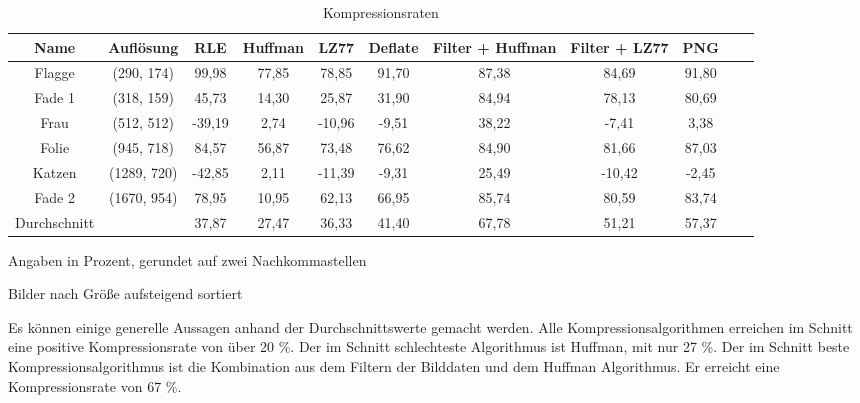 \documentclass[conference]{IEEEtran}
\begin{document}
\begin{table}
  \renewcommand*{\arraystretch}{1.1}
  \centering
  \begin{threeparttable}
    \caption{Kompressionsraten}
    \begin{tabular}{c *9{c} S[table-format=5.9]}
      \toprule
      Name         & Auflösung   & RLE    & Huffman & LZ77   & Deflate & Filter + Huffman & Filter + LZ77 & PNG   \\
      \midrule
      Flagge       & (290, 174)  & 99,98  & 77,85   & 78,85  & 91,70   & 87,38            & 84,69         & 91,80 \\
      Fade 1       & (318, 159)  & 45,73  & 14,30   & 25,87  & 31,90   & 84,94            & 78,13         & 80,69 \\
      Frau         & (512, 512)  & -39,19 & 2,74    & -10,96 & -9,51   & 38,22            & -7,41         & 3,38  \\
      Folie        & (945, 718)  & 84,57  & 56,87   & 73,48  & 76,62   & 84,90            & 81,66         & 87,03 \\
      Katzen       & (1289, 720) & -42,85 & 2,11    & -11,39 & -9,31   & 25,49            & -10,42        & -2,45 \\
      Fade 2       & (1670, 954) & 78,95  & 10,95   & 62,13  & 66,95   & 85,74            & 80,59         & 83,74 \\
      \bottomrule
      Durchschnitt &             & 37,87  & 27,47   & 36,33  & 41,40   & 67,78            & 51,21         & 57,37 \\
    \end{tabular}
    \par{} Angaben in Prozent, gerundet auf zwei Nachkommastellen
    \par{} Bilder nach Größe aufsteigend sortiert
    \label{tab:komprate}
  \end{threeparttable}
\end{table}

Es können einige generelle Aussagen anhand der Durchschnittswerte gemacht werden.
Alle Kompressionsalgorithmen erreichen im Schnitt eine positive Kompressionsrate von über 20 \%.
Der im Schnitt schlechteste Algorithmus ist Huffman, mit nur 27 \%.
Der im Schnitt beste Kompressionsalgorithmus ist die Kombination aus dem Filtern der Bilddaten
und dem Huffman Algorithmus.
Er erreicht eine Kompressionsrate von 67 \%.


\end{document}

